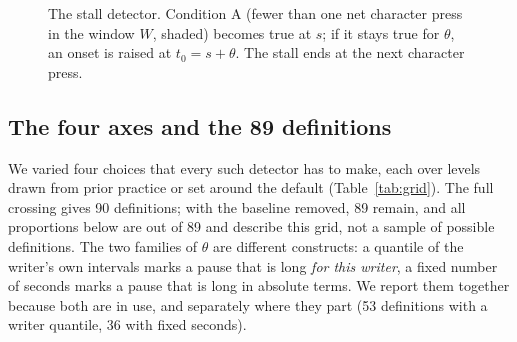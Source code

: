 \begin{figure}[t]
\centering
{}
\caption{The stall detector. Condition A (fewer than one net character press in the window $W$, shaded) becomes true at
$s$; if it stays true for $\theta$, an onset is raised at $t_0 = s + \theta$. The stall ends at the next character
press.}
\label{fig:detector}
\end{figure}

\subsection{The four axes and the 89 definitions}
\label{sec:grid}

We varied four choices that every such detector has to make, each over levels drawn from prior practice or set around
the default (Table~\ref{tab:grid}). The full crossing gives 90 definitions; with the baseline removed, 89 remain, and
all proportions below are out of 89 and describe this grid, not a sample of possible definitions. The two families of
$\theta$ are different constructs: a quantile of the writer's own intervals marks a pause that is long \emph{for this
writer}, a fixed number of seconds marks a pause that is long in absolute terms. We report them together because both
are in use, and separately where they part (53 definitions with a writer quantile, 36 with fixed seconds).

